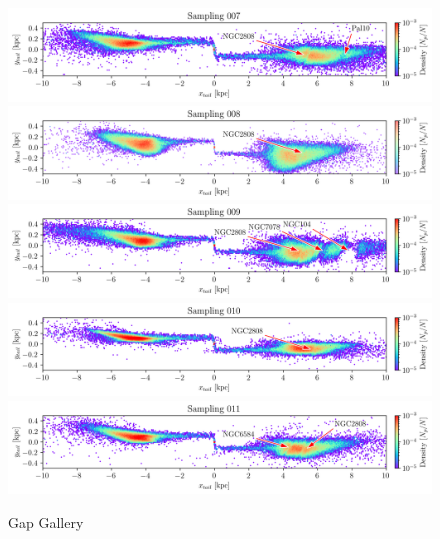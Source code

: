 \documentclass[draft]{aa}
\begin{document}
\begin{appendix}
    \begin{figure}
      \centering
      \includegraphics[width=\linewidth]{gallery_of_gaps_monte-carlo-007.png}
      \includegraphics[width=\linewidth]{gallery_of_gaps_monte-carlo-008.png}
      \includegraphics[width=\linewidth]{gallery_of_gaps_monte-carlo-009.png}      
      \includegraphics[width=\linewidth]{gallery_of_gaps_monte-carlo-010.png}
      \includegraphics[width=\linewidth]{gallery_of_gaps_monte-carlo-011.png}
      \caption{Gap Gallery}
      \label{fig:gallery2}
      \end{figure}        



\end{appendix}
\end{document}
